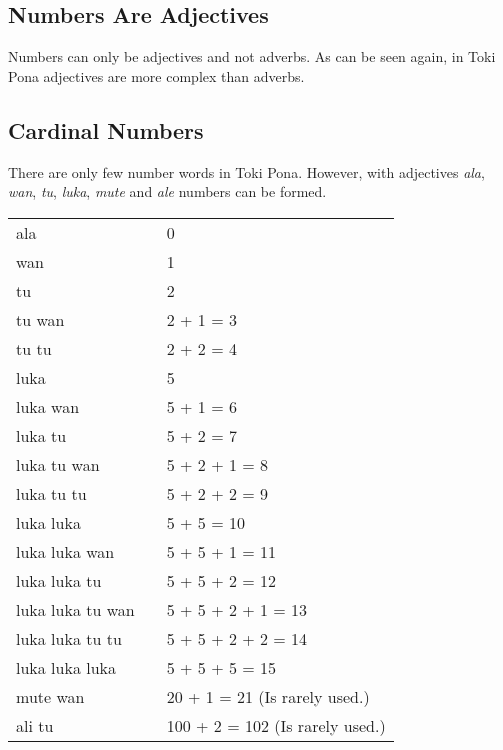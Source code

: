 \newpage

\subsection*{Numbers Are Adjectives}
Numbers can only be adjectives and not adverbs.
As can be seen again, in Toki Pona adjectives are more complex than adverbs.

\subsection*{Cardinal Numbers}
There are only few number words in Toki Pona.
However, with adjectives \textit{ala}, \textit{wan}, \textit{tu}, \textit{luka}, \textit{mute} and \textit{ale} numbers can be formed.

\begin{supertabular}{p{5,5cm}|ll}
    ala              &  & 0                               \\
    wan              &  & 1                               \\
    tu               &  & 2                               \\
    tu wan           &  & 2 + 1 = 3                       \\
    tu tu            &  & 2 + 2 = 4                       \\
    luka             &  & 5                               \\
    luka wan         &  & 5 + 1 = 6                       \\
    luka tu          &  & 5 + 2 = 7                       \\
    luka tu wan      &  & 5 + 2 + 1 = 8                   \\
    luka tu tu       &  & 5 + 2 + 2 = 9                   \\
    luka luka        &  & 5 + 5 = 10                      \\
    luka luka wan    &  & 5 + 5 + 1 = 11                  \\
    luka luka tu     &  & 5 + 5 + 2 = 12                  \\
    luka luka tu wan &  & 5 + 5 + 2 + 1 = 13              \\
    luka luka tu tu  &  & 5 + 5 + 2 + 2 = 14              \\
    luka luka luka   &  & 5 + 5 + 5 = 15                  \\
    mute wan         &  & 20 + 1 = 21 (Is rarely used.)   \\
    ali tu           &  & 100 + 2 = 102 (Is rarely used.) \\
\end{supertabular}

